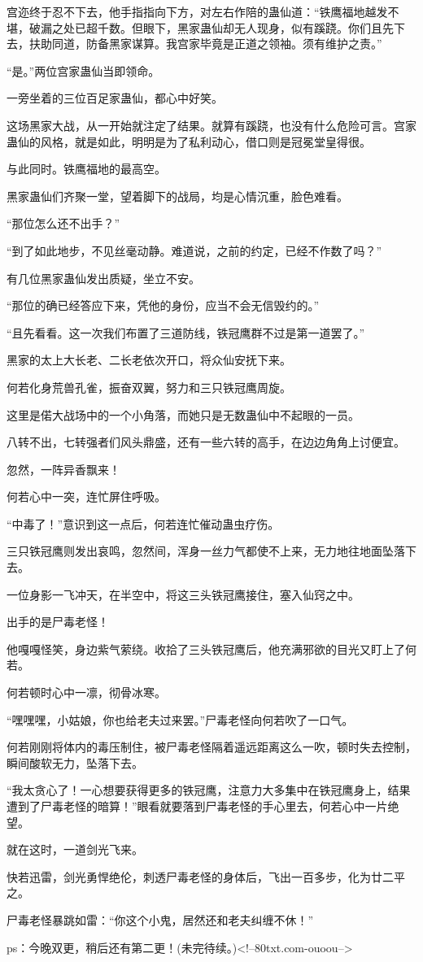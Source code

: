 \begin{this_body}
宫迩终于忍不下去，他手指指向下方，对左右作陪的蛊仙道：“铁鹰福地越发不堪，破漏之处已超千数。但眼下，黑家蛊仙却无人现身，似有蹊跷。你们且先下去，扶助同道，防备黑家谋算。我宫家毕竟是正道之领袖。须有维护之责。”

“是。”两位宫家蛊仙当即领命。

一旁坐着的三位百足家蛊仙，都心中好笑。

这场黑家大战，从一开始就注定了结果。就算有蹊跷，也没有什么危险可言。宫家蛊仙的风格，就是如此，明明是为了私利动心，借口则是冠冕堂皇得很。

与此同时。铁鹰福地的最高空。

黑家蛊仙们齐聚一堂，望着脚下的战局，均是心情沉重，脸色难看。

“那位怎么还不出手？”

“到了如此地步，不见丝毫动静。难道说，之前的约定，已经不作数了吗？”

有几位黑家蛊仙发出质疑，坐立不安。

“那位的确已经答应下来，凭他的身份，应当不会无信毁约的。”

“且先看看。这一次我们布置了三道防线，铁冠鹰群不过是第一道罢了。”

黑家的太上大长老、二长老依次开口，将众仙安抚下来。

何若化身荒兽孔雀，振奋双翼，努力和三只铁冠鹰周旋。

这里是偌大战场中的一个小角落，而她只是无数蛊仙中不起眼的一员。

八转不出，七转强者们风头鼎盛，还有一些六转的高手，在边边角角上讨便宜。

忽然，一阵异香飘来！

何若心中一突，连忙屏住呼吸。

“中毒了！”意识到这一点后，何若连忙催动蛊虫疗伤。

三只铁冠鹰则发出哀鸣，忽然间，浑身一丝力气都使不上来，无力地往地面坠落下去。

一位身影一飞冲天，在半空中，将这三头铁冠鹰接住，塞入仙窍之中。

出手的是尸毒老怪！

他嘎嘎怪笑，身边紫气萦绕。收拾了三头铁冠鹰后，他充满邪欲的目光又盯上了何若。

何若顿时心中一凛，彻骨冰寒。

“嘿嘿嘿，小姑娘，你也给老夫过来罢。”尸毒老怪向何若吹了一口气。

何若刚刚将体内的毒压制住，被尸毒老怪隔着遥远距离这么一吹，顿时失去控制，瞬间酸软无力，坠落下去。

“我太贪心了！一心想要获得更多的铁冠鹰，注意力大多集中在铁冠鹰身上，结果遭到了尸毒老怪的暗算！”眼看就要落到尸毒老怪的手心里去，何若心中一片绝望。

就在这时，一道剑光飞来。

快若迅雷，剑光勇悍绝伦，刺透尸毒老怪的身体后，飞出一百多步，化为廿二平之。

尸毒老怪暴跳如雷：“你这个小鬼，居然还和老夫纠缠不休！”

ps：今晚双更，稍后还有第二更！(未完待续。)<!--80txt.com-ouoou-->

\end{this_body}

